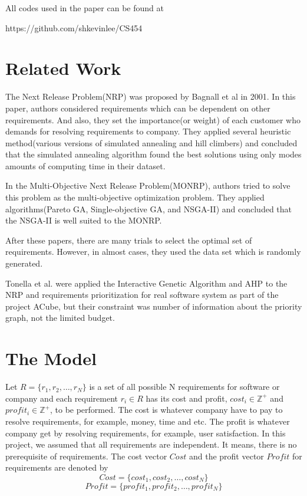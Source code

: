 All codes used in the paper can be found at 

https://github.com/shkevinlee/CS454

\section{Related Work}
The Next Release Problem(NRP)\cite{NRP} was proposed by Bagnall et al in 2001. In this paper, authors considered requirements which can be dependent on other requirements. And also, they set the importance(or weight) of each customer who demands for resolving requirements to company. They applied several heuristic method(various versions of simulated annealing and hill climbers) and concluded that the simulated annealing algorithm found the best solutions using only modes amounts of computing time in their dataset.

In the Multi-Objective Next Release Problem(MONRP)\cite{MONRP}, authors tried to solve this problem as the multi-objective optimization problem. They applied algorithms(Pareto GA, Single-objective GA, and NSGA-II) and concluded that the NSGA-II is well suited to the MONRP.

After these papers, there are many trials to select the optimal set of requirements.\cite{ILP} \cite{DE} \cite{ACO} However, in almost cases, they used the data set which is randomly generated.

Tonella et al. were applied the Interactive Genetic Algorithm and AHP to the NRP and requirements prioritization for real software system as part of the project ACube, but their constraint was number of information about the priority graph, not the limited budget.\cite{IGA} 



\section{The Model}

Let $R = \{r_1, r_2, \ldots, r_N\}$ is a set of all possible N requirements for software or company and each requirement $r_i \in R$ has its cost and profit, $cost_i \in \mathbb{Z}^+$ and $profit_i \in \mathbb{Z}^+$, to be performed. The cost is whatever company have to pay to resolve requirements, for example, money, time and etc. The profit is whatever company get by resolving requirements, for example, user satisfaction. In this project, we assumed that all requirements are independent. It means, there is no prerequisite of requirements. The cost vector $Cost$ and the profit vector $Profit$ for requirements are denoted by 
\[
Cost = \{cost_1, cost_2, \ldots, cost_N\}
\]
\[
Profit = \{profit_1, profit_2, \ldots, profit_N\}
\]

